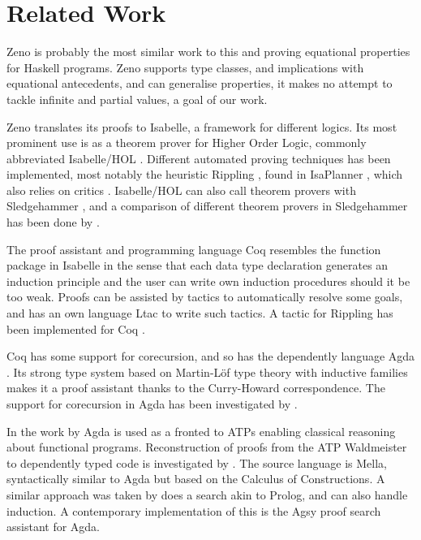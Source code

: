 \section{Related Work}

Zeno \citep{zeno} is probably the most similar work to this and
proving equational properties for Haskell programs. Zeno supports type
classes, and implications with equational antecedents, and can
generalise properties, it makes no attempt to tackle infinite and
partial values, a goal of our work.


Zeno translates its proofs to Isabelle, a framework for different
logics. Its most prominent use is as a theorem prover for Higher Order
Logic, commonly abbreviated Isabelle/HOL \citep{isabelbook}. Different
automated proving techniques has been implemented, most notably the
heuristic Rippling \citep{dixonphd}, found in IsaPlanner
\citep{isaplanner}, which also relies on critics
\citep{productiveuse}. Isabelle/HOL can also call theorem provers with
Sledgehammer \citep{hammering}, and a comparison of different theorem
provers in Sledgehammer has been done by \cite{judgement}.

The proof assistant and programming language Coq resembles the
function package in Isabelle in the sense that each data type
declaration generates an induction principle and the user can write
own induction procedures should it be too weak. Proofs can be assisted
by tactics to automatically resolve some goals, and has an own
language Ltac to write such tactics. A tactic for Rippling has been
implemented for Coq \citep{inductioncoq}.

Coq has some support for corecursion, and so has the dependently
language Agda \citep{norell:thesis}. Its strong type system based on
Martin-Löf type theory \citep{mltt} with inductive families makes it a
proof assistant thanks to the Curry-Howard correspondence. The
support for corecursion in Agda has been investigated by \cite{productivity}.

In the work by \cite{agdaatp} Agda is used as a fronted to ATPs
enabling classical reasoning about functional programs.  Reconstruction
of proofs from the ATP Waldmeister to dependently typed code is
investigated by \cite{dtatp}. The source language is Mella,
syntactically similar to Agda but based on the Calculus of
Constructions. A similar approach was taken by \cite{agsy} does a
search akin to Prolog, and can also handle induction. A contemporary
implementation of this is the Agsy proof search assistant for Agda.

